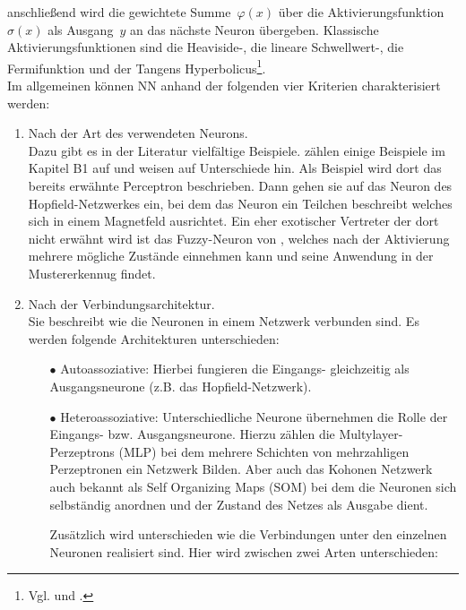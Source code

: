 anschließend wird die gewichtete Summe~$\varphi(x)$ über die Aktivierungsfunktion~$\sigma(x)$ als Ausgang~$y$ an das nächste Neuron übergeben. Klassische Aktivierungsfunktionen sind die \hbox{Heaviside-,} die lineare Schwellwert-, die Fermifunktion und der Tangens Hyperbolicus\footnote{Vgl. \citet[5]{neuralnet_intro} und \citet[39 f]{dkriesel07}.}.\\
Im allgemeinen können NN anhand der folgenden vier Kriterien charakterisiert werden:%

\begin{enumerate}
\item%
Nach der Art des verwendeten Neurons.\\
Dazu gibt es in der Literatur vielfältige Beispiele. \citet{Fiesler96} zählen einige Beispiele im Kapitel B1 auf und weisen auf Unterschiede hin. Als Beispiel wird dort das bereits erwähnte Perceptron beschrieben. Dann gehen sie auf das Neuron des Hopfield-Netzwerkes ein, bei dem das Neuron ein Teilchen beschreibt welches sich in einem Magnetfeld ausrichtet. Ein eher exotischer Vertreter der dort nicht erwähnt wird ist das Fuzzy-Neuron von \citet{fuzzy-neuron}, welches nach der Aktivierung mehrere mögliche Zustände einnehmen kann und seine Anwendung in der Mustererkennug findet.

\item%
Nach der Verbindungsarchitektur.\\
Sie beschreibt wie die Neuronen in einem Netzwerk verbunden sind.
Es werden folgende Architekturen unterschieden:
\begin{itemize}
\item[\textbf{$\bullet$}]%
Autoassoziative: Hierbei fungieren die Eingangs- gleichzeitig als Ausgangsneurone (z.B. das Hopfield-Netzwerk). 

\item[\textbf{$\bullet$}]%
Heteroassoziative: Unterschiedliche Neurone übernehmen die Rolle der Eingangs- bzw. Ausgangsneurone. Hierzu zählen die Multylayer-Perzeptrons (MLP) bei dem mehrere Schichten von mehrzahligen Perzeptronen ein Netzwerk Bilden. Aber auch das Kohonen Netzwerk auch bekannt als Self Organizing Maps (SOM) bei dem die Neuronen sich selbständig anordnen und der Zustand des Netzes als Ausgabe dient.

Zusätzlich wird unterschieden wie die Verbindungen unter den einzelnen Neuronen realisiert sind. Hier wird zwischen zwei Arten unterschieden:


\end{itemize}
\end{enumerate}
